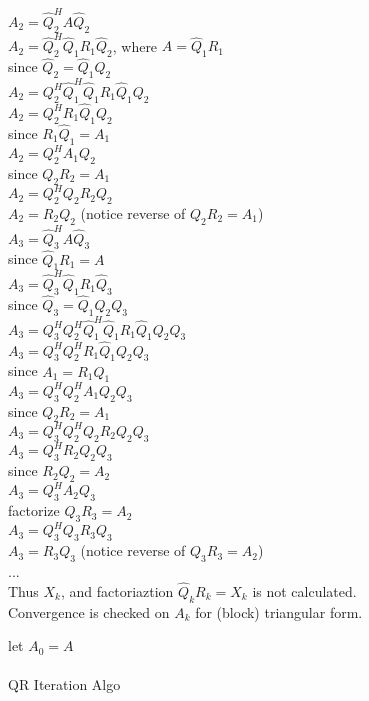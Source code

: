 \documentclass[8pt,letter]{article}
\begin{document}
\begin{multicols*}{2}
    $A_2 = \hat{Q}_2^H A \hat{Q}_2$\\
    $A_2 = \hat{Q}_2^H \hat{Q}_1 R_1 \hat{Q}_2$, where $A = \hat{Q}_1 R_1$\\
    since $\hat{Q}_2 = \hat{Q}_1 Q_2$\\
    $A_2 = Q_2^H \hat{Q}_1^H \hat{Q}_1 R_1 \hat{Q}_1 Q_2$\\
    $A_2 = Q_2^H R_1 \hat{Q}_1 Q_2$\\    
    since $R_1 \hat{Q}_1 = A_1$\\
    $A_2 = Q_2^H A_1 Q_2$\\
    since $Q_2 R_2 = A_1$\\
    $A_2 = Q_2^H Q_2 R_2 Q_2$\\
    $A_2 = R_2 Q_2$ (notice reverse of $Q_2 R_2 = A_1$)\\

    $A_3 = \hat{Q}_3^H A \hat{Q}_3$\\
    since $\hat{Q}_1 R_1 = A$\\
    $A_3 = \hat{Q}_3^H \hat{Q}_1 R_1 \hat{Q}_3$\\
    since $\hat{Q}_3 = \hat{Q}_1 Q_2 Q_3$\\
    $A_3 = Q_3^H Q_2^H \hat{Q}_1^H \hat{Q}_1 R_1 \hat{Q}_1 Q_2 Q_3$\\
    $A_3 = Q_3^H Q_2^H  R_1 \hat{Q}_1 Q_2 Q_3$\\
    since $A_1 = R_1 \hat{Q}_1$\\
    $A_3 = Q_3^H Q_2^H  A_1 Q_2 Q_3$\\
    since $Q_2 R_2 = A_1$\\
    $A_3 = Q_3^H Q_2^H Q_2 R_2 Q_2 Q_3$\\
    $A_3 = Q_3^H R_2 Q_2 Q_3$\\
    since $R_2 Q_2 = A_2$\\
    $A_3 = Q_3^H A_2 Q_3$\\
    factorize $Q_3 R_3 = A_2$\\
    $A_3 = Q_3^H Q_3 R_3 Q_3$\\
    $A_3 = R_3 Q_3$ (notice reverse of $Q_3 R_3 = A_2$)\\
    ...\\

    Thus $X_k$, and factoriaztion $\hat{Q}_k R_k = X_k$ is not calculated.\\
    Convergence is checked on $A_k$ for (block) triangular form.\\
    
    \begin{algorithm}[H]
      let $A_0 = A$\\
      \\
      \caption{QR Iteration Algo \label{Algo_QR_iteration}}
    \end{algorithm}
        
\end{multicols*}
\end{document}
